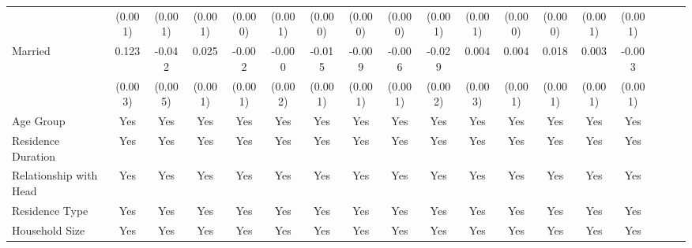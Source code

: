 \documentclass[serif, aspectratio=169]{beamer}
\begin{document}
\begin{frame}[label=different_types]
\begin{table}[htbp]
{\begin{tabular}{@{}l*{17}{c}@{}}
          &  (0.001)         &  (0.001)         &  (0.001)         &  (0.000)         &  (0.001)         &  (0.000)         &  (0.000)         &  (0.000)         &  (0.001)         &  (0.001)         &  (0.000)         &  (0.000)         &  (0.001)         &  (0.001)         \\
\addlinespace
Married   &    0.123\sym{***}&   -0.042\sym{***}&    0.025\sym{***}&   -0.002\sym{***}&   -0.000         &   -0.015\sym{***}&   -0.009\sym{***}&   -0.006\sym{***}&   -0.029\sym{***}&    0.004         &    0.004\sym{***}&    0.018\sym{***}&    0.003\sym{***}&   -0.003\sym{**} \\
          &  (0.003)         &  (0.005)         &  (0.001)         &  (0.001)         &  (0.002)         &  (0.001)         &  (0.001)         &  (0.001)         &  (0.002)         &  (0.003)         &  (0.001)         &  (0.001)         &  (0.001)         &  (0.001)         \\
\addlinespace
Age Group &      Yes         &      Yes         &      Yes         &      Yes         &      Yes         &      Yes         &      Yes         &      Yes         &      Yes         &      Yes         &      Yes         &      Yes         &      Yes         &      Yes         \\
\addlinespace
Residence Duration &      Yes         &      Yes         &      Yes         &      Yes         &      Yes         &      Yes         &      Yes         &      Yes         &      Yes         &      Yes         &      Yes         &      Yes         &      Yes         &      Yes         \\
\addlinespace
Relationship with Head &      Yes         &      Yes         &      Yes         &      Yes         &      Yes         &      Yes         &      Yes         &      Yes         &      Yes         &      Yes         &      Yes         &      Yes         &      Yes         &      Yes         \\
\addlinespace
Residence Type &      Yes         &      Yes         &      Yes         &      Yes         &      Yes         &      Yes         &      Yes         &      Yes         &      Yes         &      Yes         &      Yes         &      Yes         &      Yes         &      Yes         \\
\addlinespace
Household Size &      Yes         &      Yes         &      Yes         &      Yes         &      Yes         &      Yes         &      Yes         &      Yes         &      Yes         &      Yes         &      Yes         &      Yes         &      Yes         &      Yes         \\

\end{tabular}}
\end{table}
\end{frame}
\end{document}
